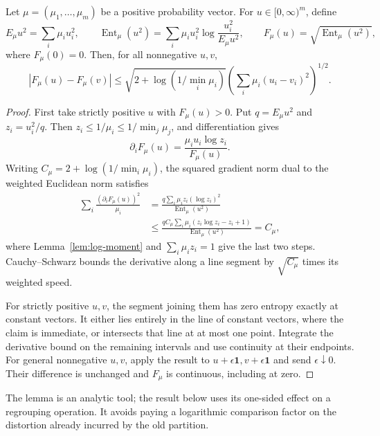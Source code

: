 \begin{lemma}
\label{lem:entropy-lipschitz}
Let $\mu=(\mu_1,\ldots,\mu_m)$ be a positive probability vector. For
$u\in[0,\infty)^m$, define
\[
 E_\mu u^2=\sum_i\mu_i u_i^2,\qquad
 \operatorname{Ent}_\mu(u^2)
 =\sum_i\mu_i u_i^2\log\frac{u_i^2}{E_\mu u^2},\qquad
 F_\mu(u)=\sqrt{\operatorname{Ent}_\mu(u^2)},
\]
where $F_\mu(0)=0$. Then, for all nonnegative $u,v$,
\begin{equation}
 |F_\mu(u)-F_\mu(v)|
 \le\sqrt{2+\log(1/\min_i\mu_i)}
       \left(\sum_i\mu_i(u_i-v_i)^2\right)^{1/2}.
 \label{eq:entropy-lipschitz}
\end{equation}
\end{lemma}
\begin{proof}
First take strictly positive $u$ with $F_\mu(u)>0$. Put
$q=E_\mu u^2$ and $z_i=u_i^2/q$. Then
$z_i\le1/\mu_i\le1/\min_j\mu_j$, and differentiation gives
\[
 \partial_iF_\mu(u)=\frac{\mu_i u_i\log z_i}{F_\mu(u)}.
\]
Writing $C_\mu=2+\log(1/\min_i\mu_i)$, the squared gradient norm dual
to the weighted Euclidean norm satisfies
\begin{align*}
 \sum_i\frac{(\partial_iF_\mu(u))^2}{\mu_i}
 &=\frac{q\sum_i\mu_i z_i(\log z_i)^2}
          {\operatorname{Ent}_\mu(u^2)}\\
 &\le\frac{q C_\mu\sum_i\mu_i(z_i\log z_i-z_i+1)}
          {\operatorname{Ent}_\mu(u^2)}=C_\mu,
\end{align*}
where Lemma~\ref{lem:log-moment} and $\sum_i\mu_i z_i=1$ give the
last two steps. Cauchy--Schwarz bounds the derivative along a line segment
by $\sqrt{C_\mu}$ times its weighted speed.

For strictly positive $u,v$, the segment joining them has zero entropy
exactly at constant vectors. It either lies entirely in the line of constant
vectors, where the claim is immediate, or intersects that line at at most
one point. Integrate the derivative bound on the remaining intervals and
use continuity at their endpoints. For general nonnegative $u,v$, apply the
result to $u+\epsilon\boldsymbol{1},v+\epsilon\boldsymbol{1}$ and send
$\epsilon\downarrow0$. Their difference is unchanged and $F_\mu$ is
continuous, including at zero.
\end{proof}

The lemma is an analytic tool; the result below uses its one-sided effect
on a regrouping operation. It avoids paying a logarithmic comparison
factor on the distortion already incurred by the old partition.

